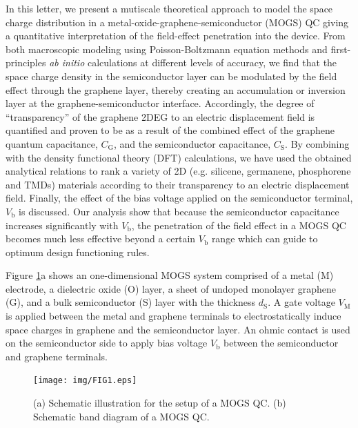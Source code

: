 \documentclass[journal=nalefd]{achemso}
\newcommand*\subs[1]{_{\text{#1}}} %
\newcommand*\change[1]{{#1}}
\begin{document}
In this letter, we present a mutiscale theoretical approach to model the space charge distribution in a 
metal-oxide-graphene-semiconductor (MOGS) QC giving a quantitative interpretation 
of the field-effect penetration into the device. 
From both macroscopic modeling using Poisson-Boltzmann equation methods
and first-principles {\it ab initio} calculations at different levels of accuracy,
we find that the space charge density in the semiconductor layer can be modulated 
by the field effect through the graphene layer, thereby creating an accumulation or inversion 
layer at the graphene-semiconductor interface. 
Accordingly, the degree of ``transparency'' of the graphene 2DEG to an 
electric displacement field is quantified
and proven to be as a result of the 
combined effect of the graphene quantum 
capacitance, $C\subs{G}$, and the semiconductor capacitance, $C\subs{S}$.
By combining with the density functional theory (DFT) calculations, 
we have used the obtained analytical relations to rank a variety of 2D (e.g. silicene, germanene, 
\change{phosphorene} and 
TMDs)
materials according to their transparency to an electric displacement field. 
Finally, the effect of the bias voltage applied on the semiconductor 
terminal, $V\subs{b}$ is discussed. 
Our analysis show that because the semiconductor capacitance 
increases significantly with $V\subs{b}$, the penetration of the field 
effect in a MOGS QC becomes much less effective beyond a 
certain $V\subs{b}$ range which can guide to optimum design functioning rules.  


Figure \ref{fig:Scheme}a shows an one-dimensional MOGS system comprised of a metal (M) 
electrode, a dielectric oxide (O) layer, a sheet of undoped monolayer graphene (G), 
and a bulk semiconductor (S) layer with the thickness $d\subs{S}$. 
A gate voltage $V\subs{M}$ is applied between the metal and graphene 
terminals to electrostatically induce space charges in graphene and the semiconductor layer. 
An ohmic contact is used on the semiconductor side to apply bias 
voltage $V\subs{b}$ between the semiconductor and graphene terminals. 

\begin{figure}[htbp]
  \texttt{[image: img/FIG1.eps]}
  \caption{(a) Schematic illustration for the setup of a MOGS QC.  (b) Schematic band diagram of a MOGS QC.}
  \label{fig:Scheme}
\end{figure}
\end{document}

